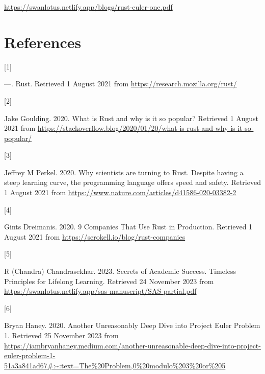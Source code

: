 \documentclass[
  a4paper,
]{article}
\newlength{\cslhangindent}
\newlength{\csllabelwidth}
\newlength{\cslentryspacingunit} %
\newenvironment{CSLReferences}[2] %
 {%
  \setlength{\parindent}{0pt}
  \ifodd #1
  \let\oldpar\par
  \def\par{\hangindent=\cslhangindent\oldpar}
  \fi
  \setlength{\parskip}{#2\cslentryspacingunit}
 }%
 {}
\newcommand{\CSLLeftMargin}[1]{\parbox[t]{\csllabelwidth}{#1}}
\newcommand{\CSLRightInline}[1]{\parbox[t]{\linewidth - \csllabelwidth}{#1}\break}
\begin{document}
\begin{small}

\begin{sffamily}

\url{https://swanlotus.netlify.app/blogs/rust-euler-one.pdf}

\end{sffamily}

\end{small}

\hypertarget{bibliography}{%
\section*{References}\label{bibliography}}

\hypertarget{refs}{}
\begin{CSLReferences}{0}{0}
\leavevmode{}%
\CSLLeftMargin{{[}1{]} }%
\CSLRightInline{---. {Rust}. Retrieved 1 August 2021 from
\url{https://research.mozilla.org/rust/}}

\leavevmode{}%
\CSLLeftMargin{{[}2{]} }%
\CSLRightInline{Jake Goulding. 2020. {What is Rust and why is it so
popular?} Retrieved 1 August 2021 from
\url{https://stackoverflow.blog/2020/01/20/what-is-rust-and-why-is-it-so-popular/}}

\leavevmode{}%
\CSLLeftMargin{{[}3{]} }%
\CSLRightInline{Jeffrey M Perkel. 2020. {Why scientists are turning to
Rust}. Despite having a steep learning curve, the programming language
offers speed and safety. Retrieved 1 August 2021 from
\url{https://www.nature.com/articles/d41586-020-03382-2}}

\leavevmode{}%
\CSLLeftMargin{{[}4{]} }%
\CSLRightInline{Gints Dreimanis. 2020. {9 Companies That Use Rust in
Production}. Retrieved 1 August 2021 from
\url{https://serokell.io/blog/rust-companies}}

\leavevmode{}%
\CSLLeftMargin{{[}5{]} }%
\CSLRightInline{R (Chandra) Chandrasekhar. 2023. {Secrets of Academic
Success}. {Timeless Principles for Lifelong Learning}. Retrieved 24
November 2023 from
\url{https://swanlotus.netlify.app/sas-manuscript/SAS-partial.pdf}}

\leavevmode{}%
\CSLLeftMargin{{[}6{]} }%
\CSLRightInline{Bryan Haney. 2020. {Another Unreasonably Deep Dive into
Project Euler Problem 1}. Retrieved 25 November 2023 from
\url{https://iambryanhaney.medium.com/another-unreasonable-deep-dive-into-project-euler-problem-1-51a3a841ad67\#:~:text=The\%20Problem,0\%20modulo\%203\%20or\%205}}

\end{CSLReferences}
\end{document}
